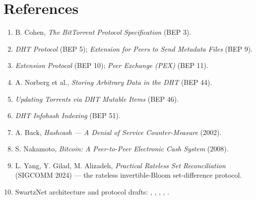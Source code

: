 \documentclass[11pt]{article}
\providecommand{\tightlist}{\setlength{\itemsep}{0pt}\setlength{\parskip}{0pt}}
\begin{document}
\hypertarget{references}{%
\section{References}\label{references}}

\begin{enumerate}
\def\labelenumi{\arabic{enumi}.}
\tightlist
\item
  B. Cohen, \emph{The BitTorrent Protocol Specification} (BEP 3).
\item
  \emph{DHT Protocol} (BEP 5); \emph{Extension for Peers to Send
  Metadata Files} (BEP 9).
\item
  \emph{Extension Protocol} (BEP 10); \emph{Peer Exchange (PEX)} (BEP
  11).
\item
  A. Norberg et al., \emph{Storing Arbitrary Data in the DHT} (BEP 44).
\item
  \emph{Updating Torrents via DHT Mutable Items} (BEP 46).
\item
  \emph{DHT Infohash Indexing} (BEP 51).
\item
  A. Back, \emph{Hashcash --- A Denial of Service Counter-Measure}
  (2002).
\item
  S. Nakamoto, \emph{Bitcoin: A Peer-to-Peer Electronic Cash System}
  (2008).
\item
  L. Yang, Y. Gilad, M. Alizadeh, \emph{Practical Rateless Set
  Reconciliation} (SIGCOMM 2024) --- the rateless invertible-Bloom
  set-difference protocol.
\item
  SwartzNet architecture and protocol drafts:
  ,
  ,
  ,
  ,
  .
\end{enumerate}
\end{document}

